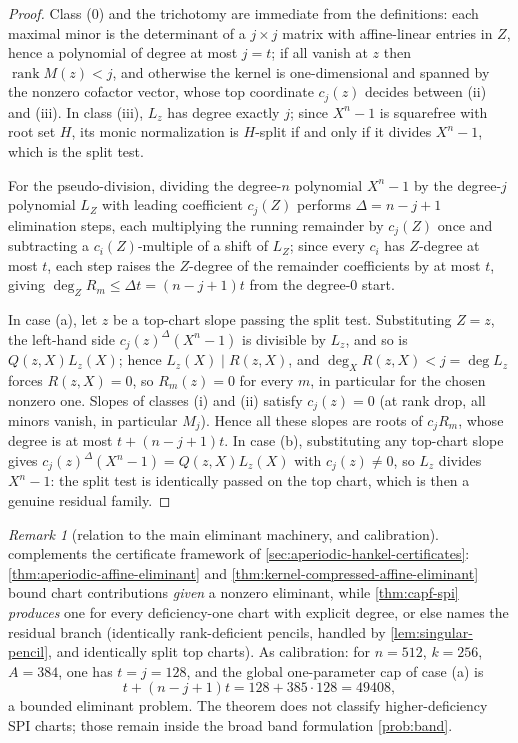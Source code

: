 \documentclass[11pt]{article}
\theoremstyle{definition}
\theoremstyle{remark}
\newtheorem{remark}[remark]{Remark}
\begin{document}
\begin{proof}
Class \textup{(0)} and the trichotomy are immediate from the definitions: each maximal minor is the determinant of a $j\times j$ matrix with affine-linear entries in $Z$, hence a polynomial of degree at most $j=t$; if all vanish at $z$ then $\operatorname{rank}M(z)<j$, and otherwise the kernel is one-dimensional and spanned by the nonzero cofactor vector, whose top coordinate $c_j(z)$ decides between \textup{(ii)} and \textup{(iii)}.  In class \textup{(iii)}, $L_z$ has degree exactly $j$; since $X^n-1$ is squarefree with root set $H$, its monic normalization is $H$-split if and only if it divides $X^n-1$, which is the split test.

For the pseudo-division, dividing the degree-$n$ polynomial $X^n-1$ by the degree-$j$ polynomial $L_Z$ with leading coefficient $c_j(Z)$ performs $\Delta=n-j+1$ elimination steps, each multiplying the running remainder by $c_j(Z)$ once and subtracting a $c_i(Z)$-multiple of a shift of $L_Z$; since every $c_i$ has $Z$-degree at most $t$, each step raises the $Z$-degree of the remainder coefficients by at most $t$, giving $\deg_ZR_m\le\Delta t=(n-j+1)t$ from the degree-$0$ start.

In case \textup{(a)}, let $z$ be a top-chart slope passing the split test.  Substituting $Z=z$, the left-hand side $c_j(z)^\Delta(X^n-1)$ is divisible by $L_z$, and so is $Q(z,X)L_z(X)$; hence $L_z(X)\mid R(z,X)$, and $\deg_XR(z,X)<j=\deg L_z$ forces $R(z,X)=0$, so $R_m(z)=0$ for every $m$, in particular for the chosen nonzero one.  Slopes of classes \textup{(i)} and \textup{(ii)} satisfy $c_j(z)=0$ \textup{(at rank drop, all minors vanish, in particular $M_j$)}.  Hence all these slopes are roots of $c_jR_m$, whose degree is at most $t+(n-j+1)t$.  In case \textup{(b)}, substituting any top-chart slope gives $c_j(z)^\Delta(X^n-1)=Q(z,X)L_z(X)$ with $c_j(z)\ne0$, so $L_z$ divides $X^n-1$: the split test is identically passed on the top chart, which is then a genuine residual family.
\end{proof}

\begin{remark}[relation to the main eliminant machinery, and calibration]\label{rem:capf-spi-calibration}
 complements the certificate framework of \cref{sec:aperiodic-hankel-certificates}: \cref{thm:aperiodic-affine-eliminant} and \cref{thm:kernel-compressed-affine-eliminant} bound chart contributions \emph{given} a nonzero eliminant, while \cref{thm:capf-spi} \emph{produces} one for every deficiency-one chart with explicit degree, or else names the residual branch \textup{(identically rank-deficient pencils, handled by \cref{lem:singular-pencil}, and identically split top charts)}.  As calibration: for $n=512$, $k=256$, $A=384$, one has $t=j=128$, and the global one-parameter cap of case \textup{(a)} is
\[
        t+(n-j+1)t=128+385\cdot128=49408,
\]
a bounded eliminant problem.  The theorem does not classify higher-deficiency SPI charts; those remain inside the broad band formulation \cref{prob:band}.
\end{remark}
\end{document}
